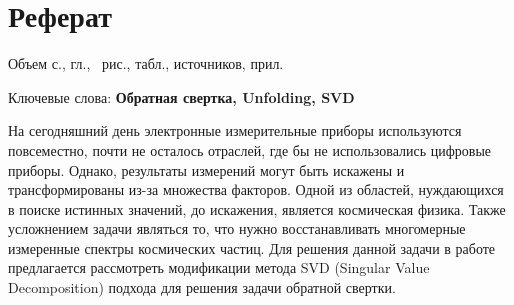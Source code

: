 \documentclass[a4paper,12pt]{diplom}
\begin{document}










\maketitle
\chapter*{Реферат}

Объем  с.,  гл., \totalfigures\ рис.,
 табл.,  источников,  прил.

\medskip

Ключевые слова: \textbf{Обратная свертка, Unfolding, SVD}

\medskip

На сегодняшний день электронные измерительные приборы используются повсеместно, почти не осталось отраслей, где бы не использовались цифровые приборы. 
Однако, результаты измерений могут быть искажены и трансформированы из-за множества факторов. Одной из областей, нуждающихся в поиске истинных 
значений, до искажения, является космическая физика. Также усложнением задачи являться то, что нужно восстанавливать многомерные измеренные спектры 
космических частиц. Для решения данной задачи в работе предлагается рассмотреть модификации метода SVD (Singular Value Decomposition) подхода для 
решения задачи обратной свертки.
\end{document}

